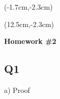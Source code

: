 \documentclass[12pt, oneside]{article}
\begin{document}
\begin{textblock*}{4cm}(-1.7cm,-2.3cm)
\end{textblock*}

\begin{textblock*}{8cm}(12.5cm,-2.3cm)
\end{textblock*}


\vspace{1cm}

\makeatletter
\setlength{\@fptop}{0pt}
\makeatother

\begin{center}
\textbf{\Large Homework \#2}
\end{center}


\subsection*{Q1}
a) Proof\\
\end{document}
